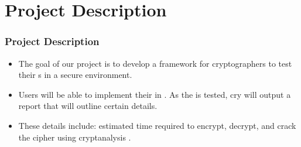 \section{Project Description}


\begin{frame}
\frametitle{Project Description}
\begin{itemize}
\item The goal of our project is to develop a framework for
  cryptographers to test their \cs s in a
  secure environment.
\item Users will be able to implement their
  \cs{} in \cry. As the \cs{} is tested, cry will
  output a report that will outline certain details.
\item These details include: estimated time required to
  encrypt, decrypt, and crack the cipher using cryptanalysis
  .
\end{itemize}
\end{frame}
